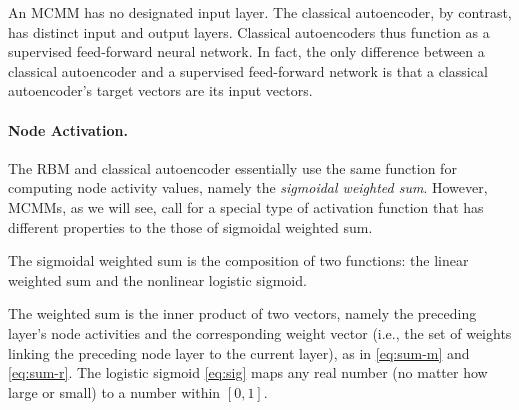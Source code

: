

An MCMM has no designated input layer. The classical autoencoder, by contrast, has distinct input and output layers. Classical autoencoders thus function as a supervised feed-forward neural network. In fact, the only difference between a classical autoencoder and a supervised feed-forward network is that a classical autoencoder's target vectors are its input vectors.

\paragraph{Node Activation.} The RBM and classical autoencoder essentially use the same function for computing node activity values, namely the \emph{sigmoidal weighted sum}.
 However, MCMMs, as we will see, call for a special type of activation function that has different properties to the those of  sigmoidal weighted sum.


The sigmoidal weighted sum is the composition of two functions: the linear weighted sum and the nonlinear logistic sigmoid. 

The weighted sum is the inner product of two vectors, namely the preceding layer's node activities and the corresponding weight vector (i.e., the set of weights linking the preceding node layer to the current layer),
as in \eqref{eq:sum-m} and \eqref{eq:sum-r}.
The logistic sigmoid \eqref{eq:sig} maps any real number (no matter how large or small) to a number within $[0,1]$.


